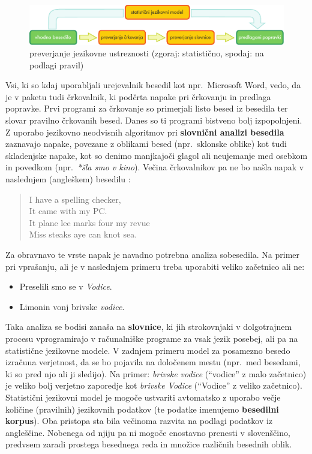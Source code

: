 \begin{multicols}{2}
\begin{figure}[b]
  \center
  \includegraphics[width=\textwidth]{../_media/slovene/language_checking}
  \caption{preverjanje jezikovne ustreznosti (zgoraj: statistično, spodaj: na podlagi pravil)}
  \label{fig:langcheckingaarch_de}
\end{figure}

Vsi, ki so kdaj uporab\-ljali urejevalnik besedil kot npr.~Microsoft Word, vedo, da je v paketu tudi črkovalnik, ki podčrta napake pri črkovanju in predlaga popravke. Prvi programi za črkovanje so primerjali listo besed iz besedila ter slovar pravilno črkovanih besed. Danes so ti programi bistveno bolj izpopolnjeni. Z uporabo jezikovno neodvisnih algoritmov pri \textbf{slovnični analizi besedila} zaznavajo napake, povezane z oblikami besed (npr.~sklonske oblike) kot tudi skladenjske napake, kot so denimo manjkajoči glagol ali  neujemanje med osebkom in povedkom (npr.~\textit{*šla smo v kino}). Večina črkovalnikov pa ne bo našla napak v naslednjem (angleškem) besedilu \cite{zar1}:

\begin{quote}
  I have a spelling checker,\\
  It came with my PC.\\
  It plane lee marks four my revue\\
  Miss steaks aye can knot sea.
\end{quote}

Za obravnavo te vrste napak je navadno potrebna analiza sobesedila. Na primer pri vprašanju, ali je v naslednjem primeru treba uporabiti veliko začetnico ali ne:

\begin{itemize}
\item Preselili smo se v \textit{Vodice}.
\item Limonin vonj brivske \textit{vodice}.
\end{itemize}

Taka analiza se bodisi zanaša na \textbf{slovnice}, ki jih strokovnjaki v dolgotrajnem procesu vprogramirajo v računalniške programe za vsak jezik posebej, ali pa na statistične jezikovne modele. V zadnjem primeru model za posamezno besedo izračuna verjetnost, da se bo pojavila na določenem mestu (npr.~med besedami, ki so pred njo ali ji sledijo). Na primer: \textit{brivske vodice} (“vodice” z malo začetnico) je veliko bolj verjetno zaporedje kot \textit{brivske Vodice} (“Vodice” z veliko začetnico). Statistični jezikovni model je mogoče ustvariti avtomatsko z uporabo večje količine (pravilnih) jezikovnih podatkov (te podatke imenujemo \textbf{besedilni korpus}). Oba pristopa sta bila  večinoma razvita na podlagi podatkov iz angleščine. Nobenega od njiju pa ni mogoče enostavno prenesti v slovenščino, predvsem zaradi prostega besednega reda in množice različnih besednih oblik.


\end{multicols}
